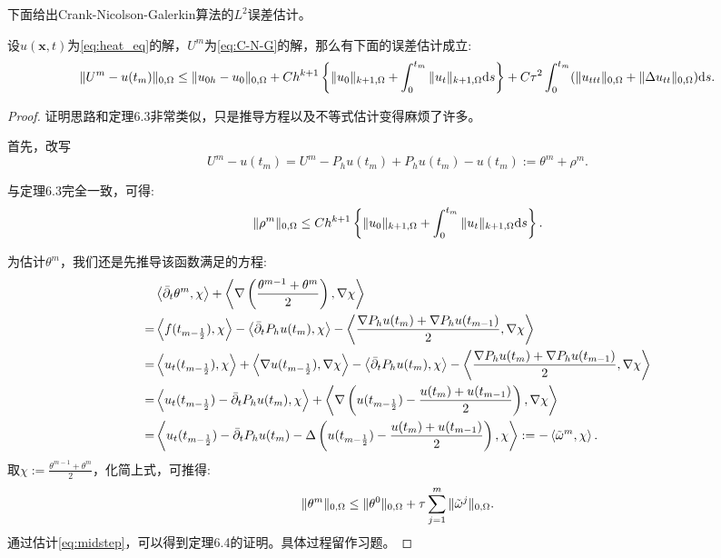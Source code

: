 下面给出Crank-Nicolson-Galerkin算法的$L^{2}$误差估计。
\begin{theorem}
    设$u(\mathbf{x},t)$为\eqref{eq:heat_eq}的解，$U^{m}$为\eqref{eq:C-N-G}的解，那么有下面的误差估计成立:
    \begin{equation}
        \|U^{m}-u(t_{m})\|_{0,\Omega}\le \|u_{0h}-u_{0}\|_{0,\Omega}+Ch^{k+1}\left\{\|u_{0}\|_{k+1,\Omega}+\int_{0}^{t_{m}}\|u_{t}\|_{k+1,\Omega}\mathrm{d} s\right\}+C\tau^{2}\int_{0}^{t_{m}}(\|u_{ttt}\|_{0,\Omega}+\|\Delta u_{tt}\|_{0,\Omega})\mathrm{d} s.
    \end{equation}
\end{theorem}
\begin{proof}
    证明思路和定理6.3非常类似，只是推导方程以及不等式估计变得麻烦了许多。

    首先，改写
    \begin{equation}
        U^{m}-u(t_{m})=U^{m}-P_{h}u(t_{m})+P_{h}u(t_{m})-u(t_{m}):=\theta^{m}+\rho^{m}.
    \end{equation}

    与定理6.3完全一致，可得:
    \begin{equation}
        \|\rho^{m}\|_{0,\Omega}\le Ch^{k+1}\left\{\|u_{0}\|_{k+1,\Omega}+\int_{0}^{t_{m}}\|u_{t}\|_{k+1,\Omega}\mathrm{d} s\right\}.
    \end{equation}
    
    为估计$\theta^{m}$，我们还是先推导该函数满足的方程:
    \begin{equation}
        \begin{aligned}
            &\left<\bar{\partial}_{t}\theta^{m},\chi\right>+\left<\nabla\left(\frac{\theta^{m-1}+\theta^{m}}{2}\right),\nabla\chi\right>\\
            =&\left<f(t_{m-\frac{1}{2}}),\chi\right>-\left<\bar{\partial}_{t}P_{h}u(t_{m}),\chi\right>-\left<\frac{\nabla P_{h}u(t_{m})+\nabla P_{h}u(t_{m-1})}{2},\nabla\chi\right>\\
            =&\left<u_{t}(t_{m-\frac{1}{2}}),\chi\right>+\left<\nabla u(t_{m-\frac{1}{2}}),\nabla\chi\right>-\left<\bar{\partial}_{t}P_{h}u(t_{m}),\chi\right>-\left<\frac{\nabla P_{h}u(t_{m})+\nabla P_{h}u(t_{m-1})}{2},\nabla\chi\right>\\
            =&\left<u_{t}(t_{m-\frac{1}{2}})-\bar{\partial}_{t}P_{h}u(t_{m}),\chi\right>+\left<\nabla\left(u(t_{m-\frac{1}{2}})-\frac{u(t_{m})+u(t_{m-1})}{2}\right),\nabla\chi\right>\\
            =&\left<u_{t}(t_{m-\frac{1}{2}})-\bar{\partial}_{t}P_{h}u(t_{m})-\Delta\left(u(t_{m-\frac{1}{2}})-\frac{u(t_{m})+u(t_{m-1})}{2}\right),\chi\right>:=-\left<\tilde{\omega}^{m},\chi\right>.\\
        \end{aligned}
    \end{equation}
    取$\chi:=\frac{\theta^{m-1}+\theta^{m}}{2}$，化简上式，可推得:
    \begin{equation}
        \label{eq:midstep}
        \|\theta^{m}\|_{0,\Omega}\le\|\theta^{0}\|_{0,\Omega}+\tau\sum_{j=1}^{m}\|\tilde{\omega}^{j}\|_{0,\Omega}.
    \end{equation}
    通过估计\eqref{eq:midstep}，可以得到定理6.4的证明。具体过程留作习题。
\end{proof}
